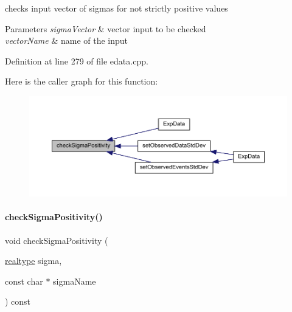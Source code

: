 checks input vector of sigmas for not strictly positive values


\begin{DoxyParams}{Parameters}
{\em sigma\+Vector} & vector input to be checked \\
\hline
{\em vector\+Name} & name of the input \\
\hline
\end{DoxyParams}


Definition at line 279 of file edata.\+cpp.

Here is the caller graph for this function\+:
\nopagebreak
\begin{figure}[H]
\begin{center}
\leavevmode
\includegraphics[width=350pt]{classamici_1_1_exp_data_a30d756faaf9ea395446fbc5c65a7b125_icgraph}
\end{center}
\end{figure}
\mbox{\label{classamici_1_1_exp_data_a0ed66c4deb1937ad309e8c52a452d9eb}} 
\paragraph{\texorpdfstring{check\+Sigma\+Positivity()}{checkSigmaPositivity()}\hspace{0.1cm}{\footnotesize\ttfamily [2/2]}}
{\footnotesize\ttfamily void check\+Sigma\+Positivity (\begin{DoxyParamCaption}\item[{\mbox{\hyperlink{namespaceamici_a1bdce28051d6a53868f7ccbf5f2c14a3}{realtype}}}]{sigma,  }\item[{const char $\ast$}]{sigma\+Name }\end{DoxyParamCaption}) const\hspace{0.3cm}{\ttfamily [protected]}}

